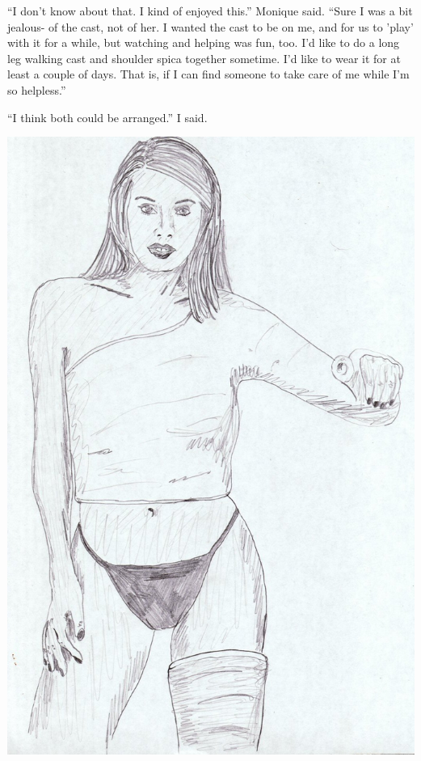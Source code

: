 ``I don't know about that. I kind of enjoyed this.'' Monique said. ``Sure I was a bit jealous-
of the cast, not of her. I wanted the cast to be on me, and for us to 'play' with it for a
while, but watching and helping was fun, too. I'd like to do a long leg walking cast and
shoulder spica together sometime. I'd like to wear it for at least a couple of days. That is, if
I can find someone to take care of me while I'm so helpless.''

``I think both could be arranged.'' I said.

\newpage
\begin{center}
\includegraphics{images/kicks33.jpg}
\end{center}
